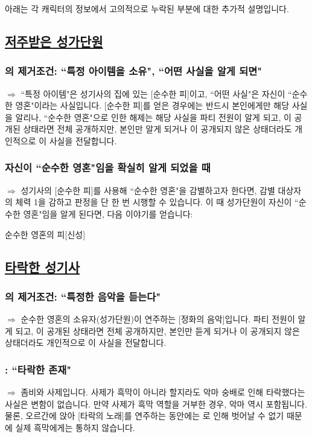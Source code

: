 \documentclass{report}
\begin{document}
	아래는 각 캐릭터의 정보에서 고의적으로 누락된 부분에 대한 추가적 설명입니다.
	
	\subsection*{\large \hyperlink{cursed-bard}{저주받은 성가단원}}
		\subsubsection*{\normalsize {}의 제거조건: ``특정 아이템을 소유", ``어떤 사실을 알게 되면"}
			$\Rightarrow$ ``특정 아이템"은 성기사의 집에 있는 [순수한 피]이고, ``어떤 사실"은 자신이 ``순수한 영혼"이라는 사실입니다. [순수한 피]를 얻은 경우에는 반드시 본인에게만 해당 사실을 알리나, ``순수한 영혼"으로 인한 해제는 해당 사실을 파티 전원이 알게 되고, 이 공개된 상태라면 전체 공개하지만, 본인만 알게 되거나 이 공개되지 않은 상태더라도 개인적으로 이 사실을 전달합니다.
		
		\subsubsection*{\normalsize 자신이 ``순수한 영혼"임을 확실히 알게 되었을 때}
			$\Rightarrow$ 성기사의 [순수한 피]를 사용해 ``순수한 영혼"을 감별하고자 한다면, 감별 대상자의 체력 1을 감하고 판정을 단 한 번 시행할 수 있습니다. 이 때 성가단원이 자신이 ``순수한 영혼"임을 알게 된다면, 다음 이야기를 얻습니다:
			\begin{story}{순수한 영혼의 피}{[신성]}
			\end{story}
	
	\subsection*{\large \hyperlink{corrupt-paladin}{타락한 성기사}}
		\subsubsection*{\normalsize {}의 제거조건: ``특정한 음악을 듣는다"}
			$\Rightarrow$ 순수한 영혼의 소유자(성가단원)이 연주하는 [정화의 음악]입니다. 파티 전원이 알게 되고, 이 공개된 상태라면 전체 공개하지만, 본인만 듣게 되거나 이 공개되지 않은 상태더라도 개인적으로 이 사실을 전달합니다.
			
		\subsubsection*{\normalsize {}: ``타락한 존재"}
			$\Rightarrow$ 좀비와 사제입니다. 사제가 흑막이 아니라 할지라도 악마 숭배로 인해 타락했다는 사실은 변함이 없습니다. 만약 사제가 흑막 역할을 거부한 경우, 악마 역시 포함됩니다. 물론, 오르간에 앉아 [타락의 노래]를 연주하는 동안에는 로 인해 벗어날 수 없기 때문에 실제 흑막에게는 통하지 않습니다.
\end{document}
